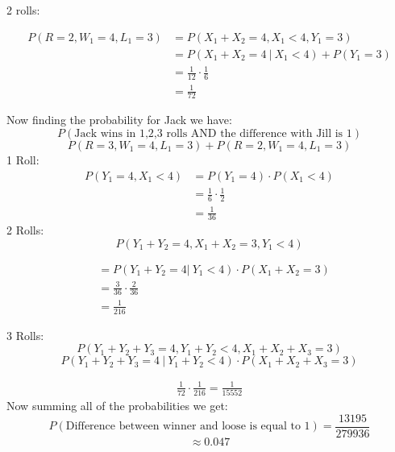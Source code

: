 \documentclass{article}
\numberwithin{equation}{section}
\newcommand{\Z}{&=}
\newcommand{\eqname}[1]{\tag*{#1}}%
\begin{document}
2 rolls: 

\begin{align}
     P(R = 2, W_1 = 4, L_1 = 3)  &= P(X_1+X_2=4, X_1 < 4,Y_1 = 3)\eqname{} \\
     \Z P(X_1+X_2 = 4 \: \vert \: X_1 < 4) + P(Y_1 = 3)\eqname{Using (2.7)} \\
     \Z \frac{1}{12} \cdot \frac{1}{6} \eqname{} \\
     \Z\frac{1}{72}
\end{align}

Now finding the probability for Jack we have: 
\begin{equation}
    P(\text{Jack wins in 1,2,3 rolls AND the difference with Jill is 1})
\end{equation}
\begin{equation}
     P(R = 3, W_1 = 4, L_1 = 3) + P(R = 2, W_1 = 4, L_1 = 3) \eqname{Using (2.2)}
\end{equation}
1 Roll: 
\begin{align}
    P(Y_1= 4, X_1 < 4) \Z P(Y_1 = 4) \cdot P(X_1 < 4)\eqname{Using (2.6)} \\
    \Z \frac{1}{6} \cdot \frac{1}{2}\eqname{} \\
    \Z \frac{1}{36}
\end{align}
2 Rolls: 
\begin{equation}
    P(Y_1 + Y_2 = 4 , X_1 + X_2 = 3, Y_1 < 4)     
\end{equation}

\begin{align} 
    \Z P(Y_1 + Y_2 = 4 \vert \:Y_1 <4) \cdot P(X_1 + X_2 = 3) \eqname{Using (2.7)} \\
    \Z \frac{3}{36} \cdot \frac{2}{36} \eqname{} \\
    \Z \frac{1}{216} 
\end{align}

3 Rolls:
\begin{equation}
    P(Y_1+Y_2+Y_3 = 4 , Y_1+Y_2 < 4,X_1+ X_2 +X_3 = 3)
\end{equation}
\begin{equation}
    P(Y_1+Y_2+Y_3 = 4\: \vert \: Y_1+Y_2 < 4) \cdot P(X_1+ X_2 +X_3 = 3)\eqname{Using (2.7)}
\end{equation}

\begin{align}
    \frac{1}{72}\cdot \frac{1}{216} = \frac{1}{15552}
\end{align}
Now summing all of the probabilities we get: 
\begin{equation}
    P(\text{Difference between winner and loose is equal to 1}) = \frac{13195}{279936}    
\end{equation}
\begin{equation}
    \approx 0.047
\end{equation}
\end{document}
